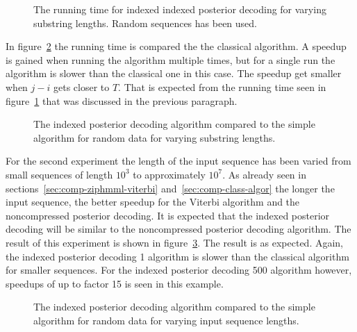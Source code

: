 \begin{figure}
  \centering
  
  \caption{The running time for indexed indexed posterior decoding for
    varying substring lengths. Random sequences has been used.}
  \label{fig:assymptotic_indexed_posterior_subseq_length.tex}
\end{figure}

In figure~\ref{fig:indexed_posterior_speedup_vs_subseq} the running time is
compared the the classical algorithm. A speedup is gained when running the
algorithm multiple times, but for a single run the algorithm is slower than the
classical one in this case. The speedup get smaller when $j - i$ gets closer to
$T$. That is expected from the running time seen in
figure~\ref{fig:assymptotic_indexed_posterior_subseq_length.tex} that was
discussed in the previous paragraph.

\begin{figure}
  \centering
  
  \caption{The indexed posterior decoding algorithm compared to the simple
    algorithm for random data for varying substring lengths.}
  \label{fig:indexed_posterior_speedup_vs_subseq}
\end{figure}

For the second experiment the length of the input sequence has been varied from
small sequences of length $10^3$ to approximately $10^7$. As already seen in
sections~\ref{sec:comp-ziphmml-viterbi} and~\ref{sec:comp-class-algor} the
longer the input sequence, the better speedup for the Viterbi algorithm and the
noncompressed posterior decoding. It is expected that the indexed posterior
decoding will be similar to the noncompressed posterior decoding algorithm. The
result of this experiment is shown in
figure~\ref{fig:indexed_posterior_speedup_vs_T}. The result is as
expected. Again, the indexed posterior decoding 1 algorithm is slower than
the classical algorithm for smaller sequences. For the indexed posterior
decoding 500 algorithm however, speedups of up to factor 15 is seen in this
example.

\begin{figure}
  \centering
  
  \caption{The indexed posterior decoding algorithm compared to the simple
    algorithm for random data for varying input sequence lengths.}
  \label{fig:indexed_posterior_speedup_vs_T}
\end{figure}

